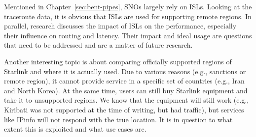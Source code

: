 Mentioned in Chapter~\ref{sec:bent-pipes}, \ac{SNO}s largely rely on \ac{ISL}s.
Looking at the traceroute data, it is obvious that \ac{ISL}s are used for
supporting remote regions. In parallel, research discusses the impact of
\ac{ISL}s on the performance, especially their influence on routing and
latency. Their impact and ideal usage are questions that need to be addressed
and are a matter of future research.

Another interesting topic is about comparing officially supported regions of
Starlink and where it is actually used. Due to various reasons (e.g., sanctions
or remote region), it cannot provide service in a specific set of countries
(e.g., Iran and North Korea). At the same time, users can still buy Starlink
equipment and take it to unsupported regions. We know that the equipment will
still work (e.g., Kiribati was not supported at the time of writing, but had
traffic), but services like IPinfo will not respond with the true location. It
is in question to what extent this is exploited and what use cases are.
